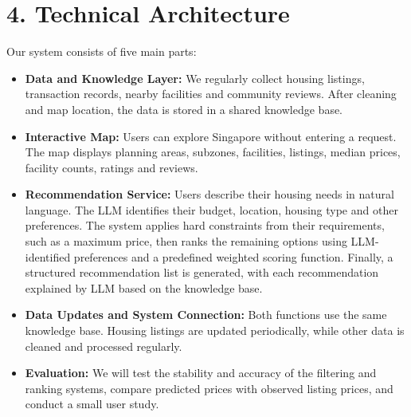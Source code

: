 \documentclass[10pt, a4paper]{article}
\begin{document}
\section*{4. Technical Architecture}
Our system consists of five main parts:

\begin{itemize}
  \item \textbf{Data and Knowledge Layer:} We regularly collect housing listings, transaction records,
  nearby facilities and community reviews. After cleaning and map location, the data is stored in a shared
  knowledge base.

  \item \textbf{Interactive Map:} Users can explore Singapore without entering a request. The map displays
  planning areas, subzones, facilities, listings, median prices, facility counts, ratings and reviews.

  \item \textbf{Recommendation Service:} Users describe their housing needs in natural language. The LLM
  identifies their budget, location, housing type and other preferences. The system applies hard constraints
  from their requirements, such as a maximum price, then ranks the remaining options using LLM-identified
  preferences and a predefined weighted scoring function. Finally, a structured recommendation list is generated, with each recommendation explained by LLM based on the knowledge base.

  \item \textbf{Data Updates and System Connection:} Both functions use the same knowledge base.
  Housing listings are updated periodically, while other data is cleaned and processed regularly.

  \item \textbf{Evaluation:} We will test the stability and accuracy of the filtering and ranking systems,
  compare predicted prices with observed listing prices, and conduct a small user study.
\end{itemize}
\end{document}
